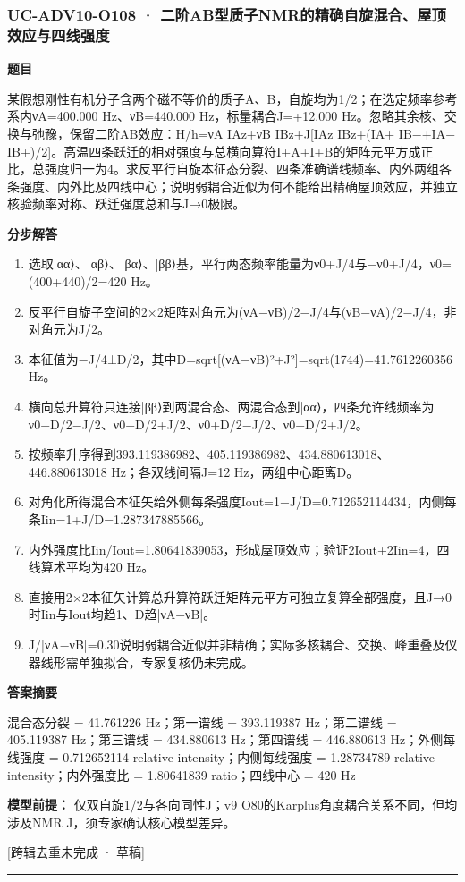 \documentclass[UTF8,11pt,a4paper]{ctexart}
\begin{document}
\subsubsection*{UC-ADV10-O108 · 二阶AB型质子NMR的精确自旋混合、屋顶效应与四线强度}
\noindent\textbf{题目}\par
某假想刚性有机分子含两个磁不等价的质子A、B，自旋均为1/2；在选定频率参考系内νA=400.000 Hz、νB=440.000 Hz，标量耦合J=+12.000 Hz。忽略其余核、交换与弛豫，保留二阶AB效应：H/h=νA IAz+νB IBz+J[IAz IBz+(IA+ IB−+IA− IB+)/2]。高温四条跃迁的相对强度与总横向算符I+A+I+B的矩阵元平方成正比，总强度归一为4。求反平行自旋本征态分裂、四条准确谱线频率、内外两组各条强度、内外比及四线中心；说明弱耦合近似为何不能给出精确屋顶效应，并独立核验频率对称、跃迁强度总和与J→0极限。\par
\medskip\noindent\textbf{分步解答}
\begin{enumerate}
\item 选取|αα⟩、|αβ⟩、|βα⟩、|ββ⟩基，平行两态频率能量为ν0+J/4与−ν0+J/4，ν0=(400+440)/2=420 Hz。
\item 反平行自旋子空间的2×2矩阵对角元为(νA−νB)/2−J/4与(νB−νA)/2−J/4，非对角元为J/2。
\item 本征值为−J/4±D/2，其中D=sqrt[(νA−νB)²+J²]=sqrt(1744)=41.7612260356 Hz。
\item 横向总升算符只连接|ββ⟩到两混合态、两混合态到|αα⟩，四条允许线频率为ν0−D/2−J/2、ν0−D/2+J/2、ν0+D/2−J/2、ν0+D/2+J/2。
\item 按频率升序得到393.119386982、405.119386982、434.880613018、446.880613018 Hz；各双线间隔J=12 Hz，两组中心距离D。
\item 对角化所得混合本征矢给外侧每条强度Iout=1−J/D=0.712652114434，内侧每条Iin=1+J/D=1.287347885566。
\item 内外强度比Iin/Iout=1.80641839053，形成屋顶效应；验证2Iout+2Iin=4，四线算术平均为420 Hz。
\item 直接用2×2本征矢计算总升算符跃迁矩阵元平方可独立复算全部强度，且J→0时Iin与Iout均趋1、D趋|νA−νB|。
\item J/|νA−νB|=0.30说明弱耦合近似并非精确；实际多核耦合、交换、峰重叠及仪器线形需单独拟合，专家复核仍未完成。
\end{enumerate}
\noindent\textbf{答案摘要}\par
混合态分裂 = 41.761226 Hz；第一谱线 = 393.119387 Hz；第二谱线 = 405.119387 Hz；第三谱线 = 434.880613 Hz；第四谱线 = 446.880613 Hz；外侧每线强度 = 0.712652114 relative intensity；内侧每线强度 = 1.28734789 relative intensity；内外强度比 = 1.80641839 ratio；四线中心 = 420 Hz\par
\noindent\textbf{模型前提：}
仅双自旋1/2与各向同性J；v9 O80的Karplus角度耦合关系不同，但均涉及NMR J，须专家确认核心模型差异。\par
\noindent\textcolor{red!65!black}{[跨辑去重未完成 · 草稿]} \par
\medskip\hrule\medskip
{}
\end{document}
